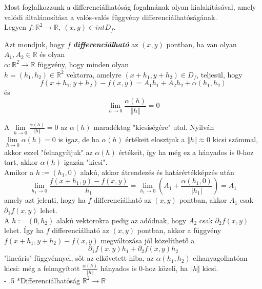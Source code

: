 \documentclass[12pt,margin=0px]{article}
\makeatletter
\newcommand\ddfrac[2]{\frac{\displaystyle #1}{\displaystyle #2}}
\renewcommand\paragraph{%
	\@startsection{paragraph}{4}{0mm}%
	{-\baselineskip}%
	{.5\baselineskip}%
	{\normalfont\normalsize\bfseries}}
\makeatother
\begin{document}
     \noindent Most foglalkozzunk a differenciálhatóság fogalmának olyan kialakításával, amely valódi általánosítása a valós-valós függvény differenciálhatóságának.\\

     \noindent Legyen $f: \mathbb{R}^2 \to \mathbb{R},\ (x,y) \in int D_f$.

     \noindent Azt mondjuk, hogy $f$ \textbf{\emph{differenciálható}} az $(x,y)$ pontban, ha van olyan $A_1, A_2 \in \mathbb{R}$ és olyan \\
     $\alpha: \mathbb{R}^2 \to \mathbb{R}$ függvény, hogy minden olyan\\
     $h = (h_1, h_2) \in \mathbb{R}^2$ vektorra, amelyre $(x + h_1, y + h_2) \in D_f$, teljesül, hogy
     \[
        f(x + h_1, y + h_2) - f(x,y) = A_1h_1 + A_2h_2 + \alpha(h_1, h_2)
     \]
     és
     \[
        \lim\limits_{h \to 0} \ddfrac{\alpha(h)}{\Vert h \Vert} = 0
     \]

     \noindent A $\lim\limits_{h \to 0} \ddfrac{\alpha(h)}{\Vert h\Vert} = 0$ az $\alpha(h)$ maradéktag "kicsiségére" utal. Nyilván $\lim\limits_{h \to 0} \alpha(h) = 0$ is igaz, de ha $\alpha(h)$ értékeit elosztjuk a $\Vert h\Vert \approx 0$ kicsi számmal, akkor ezzel "felnagyítjuk" az $\alpha(h)$ értékeit, így ha még ez a hányados is $0$-hoz tart, akkor $\alpha(h)$ igazán "kicsi".\\

     \noindent Amikor a $h := (h_1, 0)$ alakú, akkor átrendezés és határértékképzés után
     \[
        \lim\limits_{h_1 \to 0} \ddfrac{f(x + h_1, y) - f(x ,y)}{h_1} = \lim\limits_{h_1 \to 0}\left(A_1 + \ddfrac{\alpha(h_1, 0)}{|h_1|} \right) = A_1
     \]
     amely azt jelenti, hogy ha $f$ differenciálható az $(x, y)$ pontban, akkor $A_1$ csak $\partial_1 f(x, y)$ lehet.\\

     \noindent A $h := (0, h_2)$ alakú vektorokra pedig az adódnak, hogy $A_2$ csak $\partial_2 f(x, y)$ lehet. Így ha $f$ differenciálható az $(x, y)$ pontban, akkor a függvény $f(x + h_1, y + h_2) - f(x, y)$ megváltozása jól közelíthető a
     \[
        \partial_1 f(x, y)h_1 + \partial_2 f(x, y)h_2
     \]
     "lineáris" függvénnyel, sőt az elkövetett hiba, az $\alpha(h_1, h_2)$ elhanyagolhatóan kicsi: még a felnagyított $\ddfrac{\alpha(h)}{\Vert h\Vert}$ hányados is 0-hoz közeli, ha $\Vert h \Vert$ kicsi.\\

     \paragraph*{Differenciálhatóság $\mathbb{R}^2 \to \mathbb{R}$}
\end{document}

